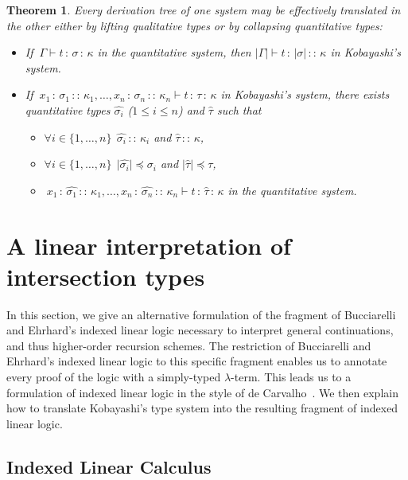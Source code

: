 \documentclass{eptcs}
\newcommand{\collapse}[1]{\vert #1 \vert}
\newtheorem{theorem}{Theorem}
\begin{document}
\begin{theorem}\label{theorem/correspondence}
Every derivation tree of one system may be effectively translated in the other either by lifting qualitative types or by collapsing quantitative types:
\begin{itemize}
\item If $\ \Gamma \vdash t\,:\,\sigma\,:\,\kappa$ in the quantitative system, then $\collapse{\Gamma} \vdash t\,:\,\collapse{\sigma}\,::\,\kappa$ in Kobayashi's system.
\item If $\ x_1\,:\,\sigma_1\,::\,\kappa_1, \ldots, x_n\,:\,\sigma_n\,::\,\kappa_n \vdash t\,:\,\tau\,:\,\kappa$ in Kobayashi's system, 
there exists quantitative types $\hat{\sigma_i}$ ($1 \leq i \leq n$) and $\hat{\tau}$ such that
\begin{itemize}
\item $\forall i \in \{1, \ldots, n\}\ \ \hat{\sigma_i}\,::\,\kappa_i$ and $\hat{\tau}\,::\,\kappa$,
\item $\forall i \in \{1, \ldots, n\}\ \ \collapse{\hat{\sigma_i}} \preccurlyeq \sigma_i$ and $\collapse{\hat{\tau}} \preccurlyeq \tau$,
\item $\ x_1\,:\,\hat{\sigma_1}\,::\,\kappa_1, \ldots, x_n\,:\,\hat{\sigma_n}\,::\,\kappa_n \vdash t\,:\,\hat{\tau}\,:\,\kappa$ in the quantitative system.
\end{itemize}
\end{itemize}
\end{theorem}


\section{A linear interpretation of intersection types}
\label{section/linear-interpretation}
In this section, we give an alternative formulation of the fragment of Bucciarelli and Ehrhard's indexed linear logic
necessary to interpret general continuations, and thus higher-order recursion schemes.
The restriction of Bucciarelli and Ehrhard's indexed linear logic \cite{ill1,ill2} to this specific fragment
enables us to annotate every proof of the logic with a simply-typed $\lambda$-term.
This leads us to a formulation of indexed linear logic in the style of de Carvalho~\cite{carvalho}.
We then explain how to translate Kobayashi's type system into the resulting fragment
of indexed linear logic.

\subsection{Indexed Linear Calculus}
\end{document}
